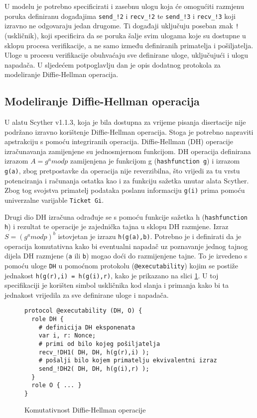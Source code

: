 U modelu je potrebno specificirati i zasebnu ulogu koja će omogućiti razmjenu
poruka definiranu događajima \texttt{send\_!2} i \texttt{recv\_!2} te
\texttt{send\_!3} i \texttt{recv\_!3} koji izravno ne odgovaraju jedan drugome.
Ti događaji uključuju poseban znak \texttt{!} (uskličnik), koji specificira da se
poruka šalje svim ulogama koje su dostupne u sklopu procesa verifikacije, a ne
samo između definiranih primatelja i pošiljatelja. Uloge u procesu verifikacije
obuhvaćaju sve definirane uloge, uključujući i ulogu napadača.
U sljedećem potpoglavlju dan je opis dodatnog protokola za modeliranje
Diffie-Hellman operacija.

\subsection{Modeliranje Diffie-Hellman operacija}

U alatu Scyther v1.1.3, koja je bila dostupna za vrijeme pisanja
disertacije nije podržano izravno korištenje Diffie-Hellman operacija.
Stoga je potrebno napraviti apstrakciju s pomoću integriranih operacija.
Diffie-Hellman (DH) operacije izračunavanja zamijenjene su jednosmjernom
funkcijom. DH operacija definirana izrazom $A = g^a mod p$ zamijenjena je
funkcijom g (\texttt{hashfunction g}) i izrazom \texttt{g(a)}, zbog pretpostavke
da operacija nije
reverzibilna, što vrijedi za tu vrstu potenciranja i računanja ostatka kao i za
funkciju sažetka unutar alata Scyther. Zbog tog svojstva primatelj podataka
poslanu informaciju \texttt{g(i)} prima pomoću univerzalne varijable
\texttt{Ticket Gi}.

Drugi dio DH izračuna odrađuje se s pomoću funkcije sažetka h
(\texttt{hashfunction h}) i rezultat te operacije je zajednička tajna u sklopu
DH razmjene. Izraz $S = (g^a mod p)^b$ istovjetan je izrazu \texttt{h(g(a),b)}.
Potrebno je i definirati da je operacija komutativna kako bi eventualni napadač uz
poznavanje jednog tajnog dijela DH razmjene (\texttt{a} ili \texttt{b}) mogao
doći do razmijenjene tajne. To je izvedeno s pomoću uloge \texttt{DH} u pomoćnom
protokolu (\texttt{@executability}) kojim se postiže jednakost \texttt{h(g(r),i)
= h(g(i),r)}, kako je prikazano na slici \ref{fig:exec_dh}. U toj specifikaciji je
korišten simbol uskličnika kod slanja i primanja kako bi ta jednakost vrijedila
za sve definirane uloge i napadača.

\begin{figure}[htb]
\begin{small}
\begin{verbatim}
protocol @executability (DH, O) {
  role DH {
    # definicija DH eksponenata
    var i, r: Nonce;
    # primi od bilo kojeg pošiljatelja
    recv_!DH1( DH, DH, h(g(r),i) );
    # pošalji bilo kojem primatelju ekvivalentni izraz
    send_!DH2( DH, DH, h(g(i),r) );
  }
  role O { ... }
}
\end{verbatim}
\end{small}
\vspace{-22pt}
\caption{Komutativnost Diffie-Hellman operacije}
\label{fig:exec_dh}
\end{figure}

